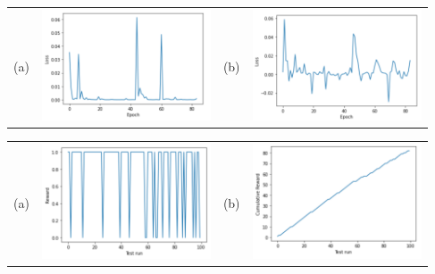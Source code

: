 \begin{center}
\begin{tabular}{lclc}
(a) &
\includegraphics[width=5cm]{fig_ppo_loss_critic.jpg}
& (b)
&\includegraphics[width=5cm]{fig_ppo_loss_actor.jpg}
\end{tabular}
\label{fig_ppo_losses}
\end{center}

\begin{center}
\begin{tabular}{lclc}
(a) &
\includegraphics[width=5cm]{fig_ppo_reward.jpg}
& (b)
&\includegraphics[width=5cm]{fig_ppo_reward_cum.jpg}
\end{tabular}
\label{fig_ppo_rewards}
\end{center}